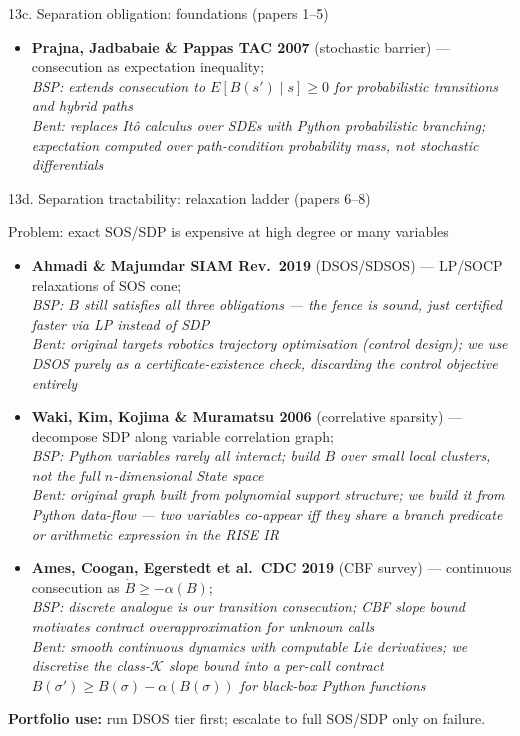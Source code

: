 \documentclass[aspectratio=169]{beamer}
\begin{document}
\begin{frame}[shrink=52]{13c. Separation obligation: foundations (papers 1--5)}
\begin{itemize}
  \item \textbf{Prajna, Jadbabaie \& Pappas TAC 2007} (stochastic barrier) --- consecution as expectation inequality;\\
    \textcolor{blue!75!black}{\textit{BSP: extends consecution to \(E[B(s')\mid s]\ge0\) for probabilistic transitions and hybrid paths}}\\
    \textcolor{orange!80!black}{\textit{Bent: replaces It\^{o} calculus over SDEs with Python probabilistic branching; expectation computed over path-condition probability mass, not stochastic differentials}}
\end{itemize}
\end{frame}

\begin{frame}[shrink=24]{13d. Separation tractability: relaxation ladder (papers 6--8)}
\begin{block}{Problem: exact SOS/SDP is expensive at high degree or many variables}
\end{block}
\begin{itemize}
  \item \textbf{Ahmadi \& Majumdar SIAM Rev.~2019} (DSOS/SDSOS) --- LP/SOCP relaxations of SOS cone;\\
    \textcolor{blue!75!black}{\textit{BSP: \(B\) still satisfies all three obligations --- the fence is sound, just certified faster via LP instead of SDP}}\\
    \textcolor{orange!80!black}{\textit{Bent: original targets robotics trajectory optimisation (control design); we use DSOS purely as a certificate-existence check, discarding the control objective entirely}}
  \item \textbf{Waki, Kim, Kojima \& Muramatsu 2006} (correlative sparsity) --- decompose SDP along variable correlation graph;\\
    \textcolor{blue!75!black}{\textit{BSP: Python variables rarely all interact; build \(B\) over small local clusters, not the full \(n\)-dimensional State space}}\\
    \textcolor{orange!80!black}{\textit{Bent: original graph built from polynomial support structure; we build it from Python \emph{data-flow} --- two variables co-appear iff they share a branch predicate or arithmetic expression in the RISE IR}}
  \item \textbf{Ames, Coogan, Egerstedt et al.~CDC 2019} (CBF survey) --- continuous consecution as \(\dot B\ge{-}\alpha(B)\);\\
    \textcolor{blue!75!black}{\textit{BSP: discrete analogue is our transition consecution; CBF slope bound motivates contract overapproximation for unknown calls}}\\
    \textcolor{orange!80!black}{\textit{Bent: smooth continuous dynamics with computable Lie derivatives; we discretise the class-\(\mathcal{K}\) slope bound into a per-call contract \(B(\sigma')\ge B(\sigma)-\alpha(B(\sigma))\) for black-box Python functions}}
\end{itemize}
\textbf{Portfolio use:} run DSOS tier first; escalate to full SOS/SDP only on failure.
\end{frame}
\end{document}
